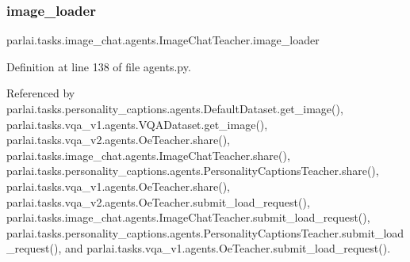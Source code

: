 \mbox{\label{classparlai_1_1tasks_1_1image__chat_1_1agents_1_1ImageChatTeacher_a9fc07cfbee29595e6b1b52b0855c4888}} 
\subsubsection{\texorpdfstring{image\+\_\+loader}{image\_loader}}
{\footnotesize\ttfamily parlai.\+tasks.\+image\+\_\+chat.\+agents.\+Image\+Chat\+Teacher.\+image\+\_\+loader}



Definition at line 138 of file agents.\+py.



Referenced by parlai.\+tasks.\+personality\+\_\+captions.\+agents.\+Default\+Dataset.\+get\+\_\+image(), parlai.\+tasks.\+vqa\+\_\+v1.\+agents.\+V\+Q\+A\+Dataset.\+get\+\_\+image(), parlai.\+tasks.\+vqa\+\_\+v2.\+agents.\+Oe\+Teacher.\+share(), parlai.\+tasks.\+image\+\_\+chat.\+agents.\+Image\+Chat\+Teacher.\+share(), parlai.\+tasks.\+personality\+\_\+captions.\+agents.\+Personality\+Captions\+Teacher.\+share(), parlai.\+tasks.\+vqa\+\_\+v1.\+agents.\+Oe\+Teacher.\+share(), parlai.\+tasks.\+vqa\+\_\+v2.\+agents.\+Oe\+Teacher.\+submit\+\_\+load\+\_\+request(), parlai.\+tasks.\+image\+\_\+chat.\+agents.\+Image\+Chat\+Teacher.\+submit\+\_\+load\+\_\+request(), parlai.\+tasks.\+personality\+\_\+captions.\+agents.\+Personality\+Captions\+Teacher.\+submit\+\_\+load\+\_\+request(), and parlai.\+tasks.\+vqa\+\_\+v1.\+agents.\+Oe\+Teacher.\+submit\+\_\+load\+\_\+request().

\mbox{\label{classparlai_1_1tasks_1_1image__chat_1_1agents_1_1ImageChatTeacher_ae8c27447869ad8645b6572994c930a43}} 
